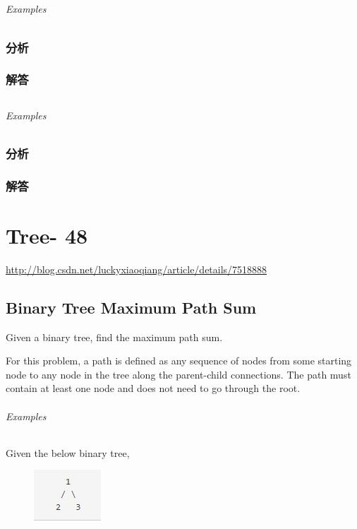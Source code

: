 \documentclass[UTF8,a4paper,12pt]{ctexbook}
\begin{document}
	
\section{}
	
	\subparagraph{Examples}
	
	\subsection{分析}
	
	\subsection{解答}
	
\section{}
	
	\subparagraph{Examples}
	
	\subsection{分析}
	
	\subsection{解答}	
\chapter{Tree- 48}
	\url{http://blog.csdn.net/luckyxiaoqiang/article/details/7518888}
\section{Binary Tree Maximum Path Sum}
		Given a binary tree, find the maximum path sum.
		
		For this problem, a path is defined as any sequence of nodes from some starting node to any node in the tree along the parent-child connections. The path must contain at least one node and does not need to go through the root.
	\subparagraph{Examples}
		Given the below binary tree,
		
		\begin{figure}[h]
			\centering
			\includegraphics[scale = 1]{Tree_1.png}
		\end{figure}
		
\end{document}
